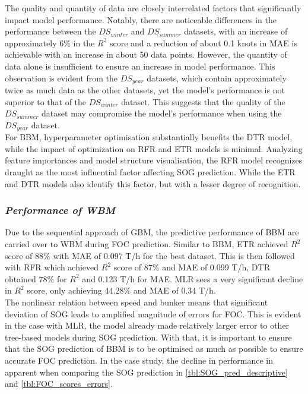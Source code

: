 The quality and quantity of data are closely interrelated factors that significantly impact model performance. Notably, there are noticeable differences in the performance between the $DS_{winter}$ and $DS_{summer}$ datasets, with an increase of approximately $6\%$ in the $R^2$ score and a reduction of about 0.1 knots in MAE is achievable with an increase in about 50 data points. However, the quantity of data alone is insufficient to ensure an increase in model performance. This observation is evident from the $DS_{year}$ datasets, which contain approximately twice as much data as the other datasets, yet the model's performance is not superior to that of the $DS_{winter}$ dataset. This suggests that the quality of the $DS_{summer}$ dataset may compromise the model's performance when using the $DS_{year}$ dataset.\\

For BBM, hyperparameter optimisation substantially benefits the DTR model, while the impact of optimization on RFR and ETR models is minimal. Analyzing feature importances and model structure visualisation, the RFR model recognizes draught as the most influential factor affecting SOG prediction. While the ETR and DTR models also identify this factor, but with a lesser degree of recognition.\\

\subsubsection*{\emph{Performance of WBM}}


Due to the sequential approach of GBM, the predictive performance of BBM are carried over to WBM during FOC prediction. Similar to BBM, ETR achieved $R^2$ score of $88\%$ with MAE of 0.097 T/h for the best dataset. This is then followed with RFR which achieved $R^2$ score of $87\%$ and MAE of 0.099 T/h, DTR obtained $78\%$ for $R^2$ and 0.123 T/h for MAE. MLR sees a very significant decline in $R^2$ score, only achieving $44.28\%$ and MAE of 0.34 T/h.\\

The nonlinear relation between speed and bunker means that significant deviation of SOG leads to amplified magnitude of errors for FOC. This is evident in the case with MLR, the model already made relatively larger error to other tree-based models during SOG prediction. With that, it is important to ensure that the SOG prediction of BBM is to be optimised as much as possible to ensure accurate FOC prediction. In the case study, the decline in performance in apparent when comparing the SOG prediction in \cref{tbl:SOG_pred_descriptive} and \cref{tbl:FOC_scores_errors}.\\

